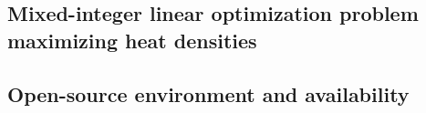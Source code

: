 \subsection{Mixed-integer linear optimization problem maximizing heat densities}

\subsection{Open-source environment and availability}






%		
